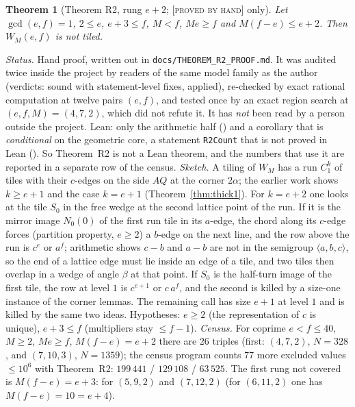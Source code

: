 \documentclass[11pt,reqno]{amsart}
\theoremstyle{plain}
\newtheorem{theorem}{Theorem}[section]
\theoremstyle{definition}
\newcommand{\lab}[1]{\textup{[\textsc{#1}]}}
\newcommand{\PH}{\lab{proved by hand}}
\begin{document}
\begin{theorem}[Theorem R2, rung $e+2$; \PH{} only]\label{thm:R2}
Let $\gcd(e,f)=1$, $2\le e$, $e+3\le f$, $M<f$, $Me\ge f$ and $M(f-e)\le e+2$. Then $W_M(e,f)$ is not tiled.
\end{theorem}
\emph{Status.} Hand proof, written out in \texttt{docs/THEOREM\_R2\_PROOF.md}. It was audited twice inside the project by readers of the same model family as the author (verdicts: sound with statement-level fixes, applied), re-checked by exact rational computation at twelve pairs $(e,f)$, and tested once by an exact region search at $(e,f,M)=(4,7,2)$, which did not refute it. It has \emph{not} been read by a person outside the project. Lean: only the arithmetic half () and a corollary that is \emph{conditional} on the geometric core, a statement \texttt{R2Count} that is not proved in Lean (). So Theorem~R2 is not a Lean theorem, and the numbers that use it are reported in a separate row of the census.
\emph{Sketch.} A tiling of $W_M$ has a run $C_1^{k}$ of tiles with their $c$-edges on the side $AQ$ at the corner $2\alpha$; the earlier work shows $k\ge e+1$ and the case $k=e+1$ (Theorem~\ref{thm:thick1}). For $k=e+2$ one looks at the tile $S_0$ in the free wedge at the second lattice point of the run. If it is the mirror image $N_0(0)$ of the first run tile in its $a$-edge, the chord along its $c$-edge forces (partition property, $e\ge2$) a $b$-edge on the next line, and the row above the run is $c^e$ or $a^f$; arithmetic shows $c-b$ and $a-b$ are not in the semigroup $\langle a,b,c\rangle$, so the end of a lattice edge must lie inside an edge of a tile, and two tiles then overlap in a wedge of angle $\beta$ at that point. If $S_0$ is the half-turn image of the first tile, the row at level $1$ is $c^{e+1}$ or $c\,a^f$, and the second is killed by a size-one instance of the corner lemmas. The remaining call has size $e+1$ at level $1$ and is killed by the same two ideas. Hypotheses: $e\ge2$ (the representation of $c$ is unique), $e+3\le f$ (multipliers stay $\le f-1$).
\emph{Census.} For coprime $e<f\le40$, $M\ge2$, $Me\ge f$, $M(f-e)=e+2$ there are $26$ triples (first: $(4,7,2)$, $N=328$, and $(7,10,3)$, $N=1359$); the census program counts $77$ more excluded values $\le10^6$ with Theorem~R2: $199\,441$ / $129\,108$ / $63\,525$. The first rung not covered is $M(f-e)=e+3$: for $(5,9,2)$ and $(7,12,2)$ (for $(6,11,2)$ one has $M(f-e)=10=e+4$).
\end{document}
